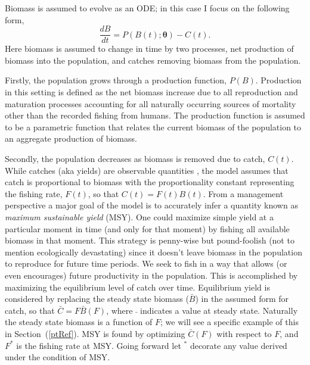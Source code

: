 \documentclass[12pt]{article}
\begin{document}
% 
Biomass is assumed to evolve as an ODE; in this case I focus on the following 
form,
%
\begin{equation}
\frac{dB}{dt} = P(B(t); \bm{\theta}) - C(t). \label{ode}
\end{equation}
Here biomass is assumed to change in time by two processes, net production of 
biomass into the population, and catches removing biomass from the population.

Firstly, the population grows through a production function, $P(B)$. Production 
in this setting is defined as the net biomass increase due to all reproduction 
and maturation processes accounting for all naturally occurring %
sources of mortality other than the recorded fishing from humans. The 
production function is assumed to be a parametric function that relates the 
current biomass of the population to an aggregate production of biomass. 

%
Secondly, the population decreases as biomass is removed due to catch, $C(t)$. 
While catches (aka yields) are observable quantities , %
the model assumes that catch is proportional to biomass with the 
proportionality constant representing the fishing rate, $F(t)$, so that $C(t)=F(t)B(t)$. 
From a management perspective a major goal of the model is to accurately infer 
a quantity known as \emph{maximum sustainable yield} (MSY). One could maximize 
simple yield at a particular moment in time (and only for that moment) by 
fishing all available biomass in that moment. This strategy is penny-wise but 
pound-foolish (not to mention ecologically devastating) since it doesn't leave 
biomass in the population to reproduce for future time periods. We seek to 
fish in a way that allows (or even encourages) future productivity in the 
population. This is accomplished by maximizing the equilibrium level of catch 
over time. Equilibrium yield is considered by replacing the steady state 
biomass ($\bar B$) in the assumed form for catch, so that $\bar C = F\bar B(F)$, 
where $\bar~$ indicates a value at steady state.  Naturally the steady state 
biomass is a function of $F$; we will see a specific example of this in 
\mbox{Section (\ref{ptRef}).} MSY is found by optimizing $\bar C(F)$ with respect to 
$F$, and $F^*$ is the fishing rate at MSY. Going forward let $^*$ decorate any 
value derived under the condition of MSY.  
\end{document}
